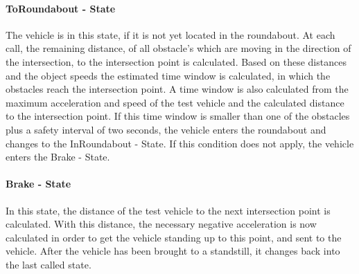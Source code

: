 \documentclass[11pt,oneside,openright]{mpreport}
\begin{document}
\paragraph{ToRoundabout - State}
The vehicle is in this state, if it is not yet located in the roundabout. At each call, the remaining distance,
of all obstacle's which are moving in the direction of the intersection, to the intersection point is calculated.
Based on these distances and the object speeds the estimated time window is calculated, in which the obstacles reach the intersection point.
A time window is also calculated from the maximum acceleration and speed of the test vehicle and the calculated distance to the intersection point.
If this time window is smaller than one of the obstacles plus a safety interval of two seconds, the vehicle enters the roundabout and changes to the InRoundabout - State.
If this condition does not apply, the vehicle enters the Brake - State.

\paragraph{Brake - State}
In this state, the distance of the test vehicle to the next intersection point is calculated.
With this distance, the necessary negative acceleration is now calculated in order to get the vehicle standing up to this point,
and sent to the vehicle. After the vehicle has been brought to a standstill, it changes back into the last called state.
\end{document}
